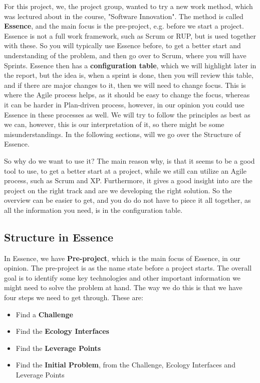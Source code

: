 For this project, we, the project group, wanted to try a new work method, which was lectured about in the course, "Software Innovation".
The method is called \textbf{Essence}, and the main focus is the pre-project, e.g. before we start a project.
Essence is not a full work framework, such as Scrum or RUP, but is used together with these.
So you will typically use Essence before, to get a better start and understanding of the problem, and then go over to Scrum, where you will have Sprints. 
Essence then has a \textbf{configuration table}, which we will highlight later in the report, but the idea is, when a sprint is done, then you will review this table, and if there are major changes to it, then we will need to change focus.
This is where the Agile process helps, as it should be easy to change the focus, whereas it can be harder in Plan-driven process, however, in our opinion you could use Essence in these processes as well. 
We will try to follow the principles as best as we can, however, this is our interpretation of it, so there might be some misunderstandings.
In the following sections, will we go over the Structure of Essence.

So why do we want to use it?
The main reason why, is that it seems to be a good tool to use, to get a better start at a project, while we still can utilize an Agile process, such as Scrum and XP.
Furthermore, it gives a good insight into are the project on the right track and are we developing the right solution.
So the overview can be easier to get, and you do do not have to piece it all together, as all the information you need, is in the configuration table.

\subsection{Structure in Essence}
In Essence, we have \textbf{Pre-project}, which is the main focus of Essence, in our opinion.
The pre-project is as the name state before a project starts. 
The overall goal is to identify some key technologies and other important information we might need to solve the problem at hand.
The way we do this is that we have four steps we need to get through.
These are:

\begin{itemize}
    \item Find a \textbf{Challenge}
    \item Find the \textbf{Ecology Interfaces}
    \item Find the \textbf{Leverage Points}
    \item Find the \textbf{Initial Problem}, from the Challenge, Ecology Interfaces and Leverage Points
\end{itemize}

